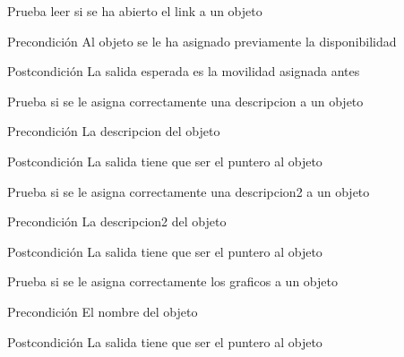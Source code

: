 \begin{DoxyRefList}
\item[\label{test__test000197}%
\hypertarget{test__test000197}{}%
Global \hyperlink{object__test_8c_a8007a1d3bac0b59de9efdfe77924486c}{test1\-\_\-object\-\_\-\-Get\-\_\-\-Open} ()]Prueba leer si se ha abierto el link a un objeto \begin{DoxyPrecond}{Precondición}
Al objeto se le ha asignado previamente la disponibilidad 
\end{DoxyPrecond}
\begin{DoxyPostcond}{Postcondición}
La salida esperada es la movilidad asignada antes  
\end{DoxyPostcond}

\item[\label{test__test000165}%
\hypertarget{test__test000165}{}%
Global \hyperlink{object__test_8c_afb26b8c66d332354df8bfd57a8033b8f}{test1\-\_\-object\-\_\-set\-\_\-description} ()]Prueba si se le asigna correctamente una descripcion a un objeto \begin{DoxyPrecond}{Precondición}
La descripcion del objeto 
\end{DoxyPrecond}
\begin{DoxyPostcond}{Postcondición}
La salida tiene que ser el puntero al objeto  
\end{DoxyPostcond}

\item[\label{test__test000167}%
\hypertarget{test__test000167}{}%
Global \hyperlink{object__test_8c_a37d3eb94b74ecc8a14bffd09952c858e}{test1\-\_\-object\-\_\-set\-\_\-description2} ()]Prueba si se le asigna correctamente una descripcion2 a un objeto \begin{DoxyPrecond}{Precondición}
La descripcion2 del objeto 
\end{DoxyPrecond}
\begin{DoxyPostcond}{Postcondición}
La salida tiene que ser el puntero al objeto  
\end{DoxyPostcond}

\item[\label{test__test000161}%
\hypertarget{test__test000161}{}%
Global \hyperlink{object__test_8c_ab56cfa4504ae8275d8c38e543c76412f}{test1\-\_\-object\-\_\-set\-\_\-graphics} ()]Prueba si se le asigna correctamente los graficos a un objeto \begin{DoxyPrecond}{Precondición}
El nombre del objeto 
\end{DoxyPrecond}
\begin{DoxyPostcond}{Postcondición}
La salida tiene que ser el puntero al objeto  
\end{DoxyPostcond}


\end{DoxyRefList}
